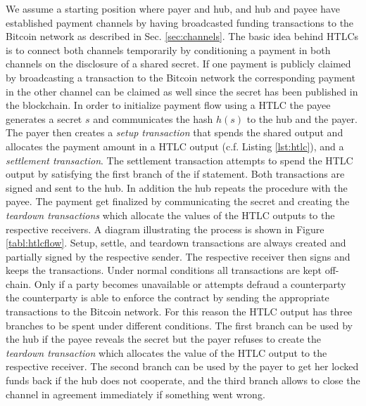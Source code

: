 \documentclass[10pt,journal,compsoc]{IEEEtran}
\begin{document}
We assume a starting position where payer and hub, and hub and payee have established payment channels by having broadcasted funding transactions to the Bitcoin network as described in Sec. \ref{sec:channels}. The basic idea behind HTLCs is to connect both channels temporarily by conditioning a payment in both channels on the disclosure of a shared secret. If one payment is publicly claimed by broadcasting a transaction to the Bitcoin network the corresponding payment in the other channel can be claimed as well since the secret has been published in the blockchain. In order to initialize  payment flow using a HTLC the payee generates a secret $s$ and communicates the hash $h(s)$ to the hub and the payer. The payer then creates a \emph{setup transaction} that spends the shared output and allocates the payment amount in a HTLC output (c.f. Listing \ref{lst:htlc}), and a \emph{settlement transaction}. The settlement transaction attempts to spend the HTLC output by satisfying the first branch of the if statement. Both transactions are signed and sent to the hub. In addition the hub repeats the procedure with the payee. The payment get finalized by communicating the secret and creating the \emph{teardown transactions} which allocate the values of the HTLC outputs to the respective receivers. A diagram illustrating the process is shown in Figure \ref{tabl:htlcflow}. Setup, settle, and teardown transactions are always created and partially signed by the respective sender. The respective receiver then signs and keeps the transactions.
Under normal conditions all transactions are kept off-chain. Only if a party becomes unavailable or attempts defraud a counterparty the counterparty is able to enforce the contract by sending the appropriate transactions to the Bitcoin network. For this reason the HTLC output has three branches to be spent under different conditions. The first branch can be used by the hub if the payee reveals the secret but the payer refuses to create the \emph{teardown transaction} which allocates the value of the HTLC output to the respective receiver. The second branch can be used by the payer to get her locked funds back if the hub does not cooperate, and the third branch allows to close the channel in agreement immediately if something went wrong. 
\end{document}

